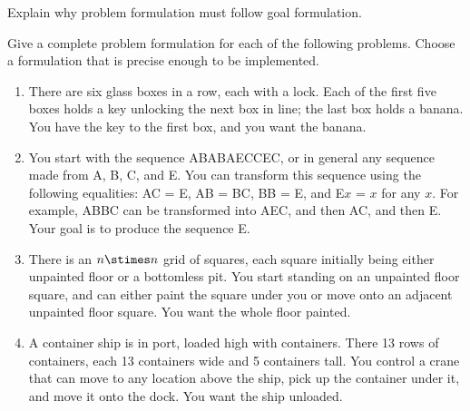 
\begin{exercise}
Explain why problem formulation must follow goal formulation.
\end{exercise} 

\begin{iexercise}%
Give a complete problem formulation for each of the following
problems.  Choose a formulation that is precise enough to be
implemented.
\begin{enumerate}
\item There are six glass boxes in a row, each with a lock.  Each of
  the first five boxes holds a key unlocking the next box in line; the
  last box holds a banana.  You have the key to the first box, and you
  want the banana. 
\item  You start with the sequence ABABAECCEC, or in general any
  sequence made from A, B, C, and E.  You can transform this sequence
  using the following equalities:  AC = E, AB = BC, BB = E, and E\(x\) = \(x\)
  for any \(x\).  For example, ABBC can be transformed into AEC, and then
  AC, and then E.  Your goal is to produce the sequence E. 
\item  There is an \(n \stimes n\) grid of squares, each square initially being
  either unpainted floor or a bottomless pit.  You start standing on
  an unpainted floor square, and can either paint the square under
  you or move onto an adjacent unpainted floor square.  You want the
  whole floor painted. 
\item A container ship is in port, loaded high with containers.  There
  13 rows of containers, each 13 containers wide and 5 containers
  tall.  You control a crane that can move to any location above the
  ship, pick up the container under it, and move it onto the dock.
  You want the ship unloaded. 
\end{enumerate}
\end{iexercise} 

